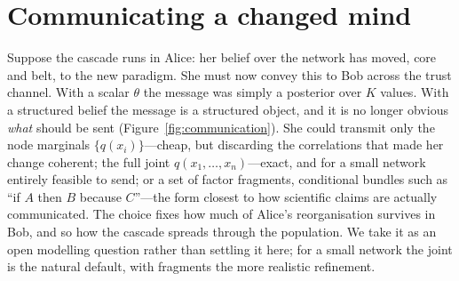 \documentclass[11pt,a4paper]{article}
\begin{document}
\section{Communicating a changed mind}

Suppose the cascade runs in Alice: her belief over the network has moved, core
and belt, to the new paradigm. She must now convey this to Bob across the trust
channel. With a scalar $\theta$ the message was simply a posterior over $K$
values. With a structured belief the message is a structured object, and it is
no longer obvious \emph{what} should be sent (Figure~\ref{fig:communication}).
She could transmit only the node marginals $\{q(x_i)\}$---cheap, but discarding
the correlations that made her change coherent; the full joint
$q(x_1,\dots,x_n)$---exact, and for a small network entirely feasible to send;
or a set of factor fragments, conditional bundles such as ``if $A$ then $B$
because $C$''---the form closest to how scientific claims are actually
communicated. The choice fixes how much of Alice's reorganisation survives in
Bob, and so how the cascade spreads through the population. We take it as an
open modelling question rather than settling it here; for a small network the
joint is the natural default, with fragments the more realistic refinement.
\end{document}

